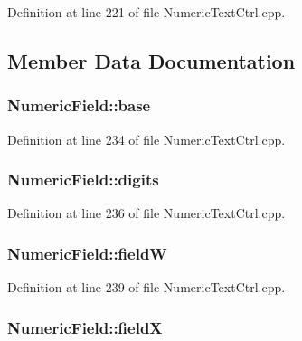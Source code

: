 Definition at line 221 of file Numeric\+Text\+Ctrl.\+cpp.



\subsection{Member Data Documentation}
\subsubsection[{\texorpdfstring{base}{base}}]{ Numeric\+Field\+::base}\hypertarget{class_numeric_field_a8fb95517ef01a98c5b32d9ef0e24585a}{}\label{class_numeric_field_a8fb95517ef01a98c5b32d9ef0e24585a}


Definition at line 234 of file Numeric\+Text\+Ctrl.\+cpp.

\subsubsection[{\texorpdfstring{digits}{digits}}]{ Numeric\+Field\+::digits}\hypertarget{class_numeric_field_ae45a3a34c523f63f47ed94ea0edcd850}{}\label{class_numeric_field_ae45a3a34c523f63f47ed94ea0edcd850}


Definition at line 236 of file Numeric\+Text\+Ctrl.\+cpp.

\subsubsection[{\texorpdfstring{fieldW}{fieldW}}]{ Numeric\+Field\+::fieldW}\hypertarget{class_numeric_field_a51ec24b02af9be49af04babd54086da3}{}\label{class_numeric_field_a51ec24b02af9be49af04babd54086da3}


Definition at line 239 of file Numeric\+Text\+Ctrl.\+cpp.

\subsubsection[{\texorpdfstring{fieldX}{fieldX}}]{ Numeric\+Field\+::fieldX}\hypertarget{class_numeric_field_a4c9620dd08456efe32168e87b86ca7ce}{}\label{class_numeric_field_a4c9620dd08456efe32168e87b86ca7ce}


